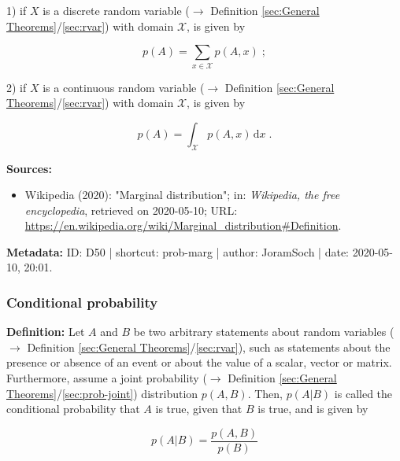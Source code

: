 \documentclass[a4paper,12pt,twoside]{book}
\begin{document}
1) if $X$ is a discrete random variable ($\rightarrow$ Definition \ref{sec:General Theorems}/\ref{sec:rvar}) with domain $\mathcal{X}$, is given by

\begin{equation} \label{eq:prob-marg-prob-marg-disc}
p(A) = \sum_{x \in \mathcal{X}} p(A,x) \; ;
\end{equation}

2) if $X$ is a continuous random variable ($\rightarrow$ Definition \ref{sec:General Theorems}/\ref{sec:rvar}) with domain $\mathcal{X}$, is given by

\begin{equation} \label{eq:prob-marg-prob-marg-cont}
p(A) = \int_{\mathcal{X}} p(A,x) \, \mathrm{d}x \; .
\end{equation}


\vspace{1em}
\textbf{Sources:}
\begin{itemize}
\item Wikipedia (2020): "Marginal distribution"; in: \textit{Wikipedia, the free encyclopedia}, retrieved on 2020-05-10; URL: \url{https://en.wikipedia.org/wiki/Marginal_distribution#Definition}.
\end{itemize}


\vspace{1em}
\textbf{Metadata:} ID: D50 | shortcut: prob-marg | author: JoramSoch | date: 2020-05-10, 20:01.
\vspace{1em}



\subsubsection[\textit{Conditional probability}]{Conditional probability} \label{sec:prob-cond}
\setcounter{equation}{0}

\textbf{Definition:} Let $A$ and $B$ be two arbitrary statements about random variables ($\rightarrow$ Definition \ref{sec:General Theorems}/\ref{sec:rvar}), such as statements about the presence or absence of an event or about the value of a scalar, vector or matrix. Furthermore, assume a joint probability ($\rightarrow$ Definition \ref{sec:General Theorems}/\ref{sec:prob-joint}) distribution $p(A,B)$. Then, $p(A \vert B)$ is called the conditional probability that $A$ is true, given that $B$ is true, and is given by

\begin{equation} \label{eq:prob-cond-prob-cond}
p(A|B) = \frac{p(A,B)}{p(B)}
\end{equation}
\end{document}
